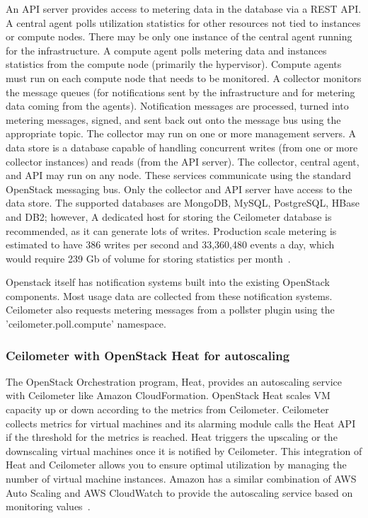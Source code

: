 \documentclass{sig-alternate-05-2015}
\begin{document}
An API server provides access to metering data in the database via a REST API. A central agent polls utilization statistics for other resources not tied to instances or compute nodes. There may be only one instance of the central agent running for the infrastructure. A compute agent polls metering data and instances statistics from the compute node (primarily the hypervisor). Compute agents must run on each compute node that needs to be monitored. A collector monitors the message queues (for notifications sent by the infrastructure and for metering data coming from the agents). Notification messages are processed, turned into metering messages, signed, and sent back out onto the message bus using the appropriate topic. The collector may run on one or more management servers. A data store is a database capable of handling concurrent writes (from one or more collector instances) and reads (from the API server). The collector, central agent, and API may run on any node. These services communicate using the standard OpenStack messaging bus. Only the collector and API server have access to the data store. The supported databases are MongoDB, MySQL, PostgreSQL, HBase and DB2; however, A dedicated host for storing the Ceilometer database is recommended, as it can generate lots of writes. Production scale metering is estimated to have 386 writes per second and 33,360,480 events a day, which would require 239 Gb of volume for storing statistics per month~\cite{Barcet12}.

Openstack itself has notification systems built into the existing OpenStack components. Most usage data are collected from these notification systems. Ceilometer also requests metering messages from a pollster plugin using the 'ceilometer.poll.compute' namespace.

\subsubsection{Ceilometer with OpenStack Heat for autoscaling}

The OpenStack Orchestration program, Heat, provides an autoscaling service with Ceilometer like Amazon CloudFormation. OpenStack Heat scales VM capacity up or down according to the metrics from Ceilometer. Ceilometer collects metrics for virtual machines and its alarming module calls the Heat API if the threshold for the metrics is reached. Heat triggers the upscaling or the downscaling virtual machines once it is notified by Ceilometer. This integration of Heat and Ceilometer allows you to ensure optimal utilization by managing the number of virtual machine instances. Amazon has a similar combination of AWS Auto Scaling and AWS CloudWatch to provide the autoscaling service based on monitoring values~\cite{Abaakouk13}.
\end{document}
